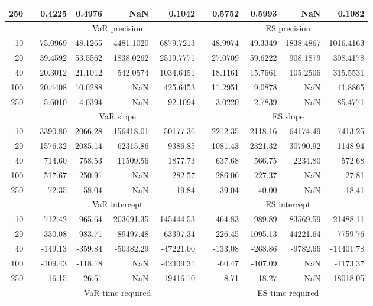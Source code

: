 {\begin{table}[h]
\begin{tabular}{rr rrrr r rrrr}
250 && 0.4225  & 0.4976  &    NaN & 0.1042 && 0.5752  & 0.5993  &    NaN & 0.1082 \\ 
\hline 
 & & \multicolumn{4}{c}{VaR precision} &&  \multicolumn{4}{c}{ES precision} \\ \cline{3-6}  \cline{8-11}
10 && 75.0969 & 48.1265 & 4481.1020 & 6879.7213 & & 48.9974 & 49.3349 & 1838.4867 & 1016.4163 \\ 
20 && 39.4592 & 53.5562 & 1838.0262 & 2519.7771 & & 27.0709 & 59.6222 & 908.1879 & 308.4178 \\ 
40 && 20.3012 & 21.1012 & 542.0574 & 1034.6451 & & 18.1161 & 15.7661 & 105.2506 & 315.5531 \\ 
100 && 20.4408 & 10.0288 &    NaN & 425.6453 & & 11.2951 & 9.0878 &    NaN & 41.8865 \\ 
250 && 5.6010 & 4.0394 &    NaN & 92.1094 & & 3.0220 & 2.7839 &    NaN & 85.4771 \\ 
\hline 
 & & \multicolumn{4}{c}{ VaR slope} && \multicolumn{4}{c}{ES slope} \\ \cline{3-6}  \cline{8-11}
10 && 3390.80 & 2066.28 & 156418.01 & 50177.36 && 2212.35 & 2118.16 & 64174.49 & 7413.25 \\ 
20 && 1576.32 & 2085.14 & 62315.86 & 9386.85 && 1081.43 & 2321.32 & 30790.92 & 1148.94 \\ 
40 && 714.60 & 758.53 & 11509.56 & 1877.73 && 637.68 & 566.75 & 2234.80 & 572.68 \\ 
100 && 517.67 & 250.91 &  NaN & 282.57 && 286.06 & 227.37 &  NaN & 27.81 \\ 
250 && 72.35 & 58.04 &  NaN & 19.84 && 39.04 & 40.00 &  NaN & 18.41 \\ 
\hline 
 & & \multicolumn{4}{c}{ VaR intercept} &&  \multicolumn{4}{c}{ES intercept} \\ \cline{3-6}  \cline{8-11}
10 && -712.42 & -965.64 & -203691.35 & -145444.53 && -464.83 & -989.89 & -83569.59 & -21488.11 \\ 
20 && -330.08 & -983.71 & -89497.48 & -63397.34 && -226.45 & -1095.13 & -44221.64 & -7759.76 \\ 
40 && -149.13 & -359.84 & -50382.29 & -47221.00 && -133.08 & -268.86 & -9782.66 & -14401.78 \\ 
100 && -109.43 & -118.18 &  NaN & -42409.31 && -60.47 & -107.09 &  NaN & -4173.37 \\ 
250 && -16.15 & -26.51 &  NaN & -19416.10 && -8.71 & -18.27 &  NaN & -18018.05 \\ 
\hline 
 & & \multicolumn{4}{c}{VaR time required} && \multicolumn{4}{c}{ES time required} \\ \cline{3-6}  \cline{8-11}

\end{tabular}
\end{table}}
